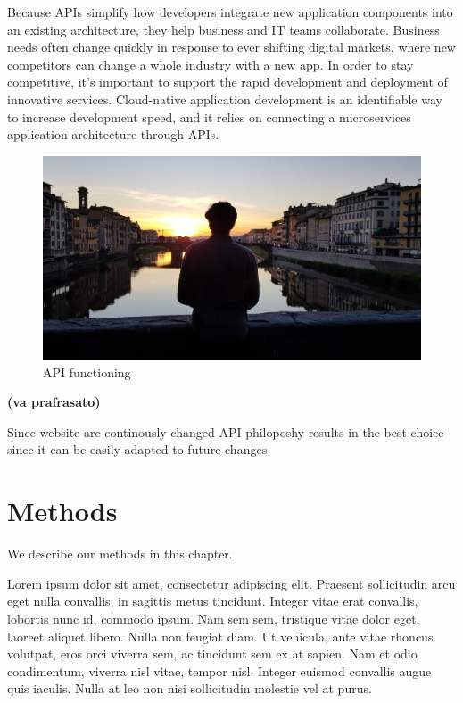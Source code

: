 \documentclass[
  12pt,
  a4paper,
  oneside]{book}
\begin{document}
Because APIs simplify how developers integrate new application components into an existing architecture, they help business and IT teams collaborate. Business needs often change quickly in response to ever shifting digital markets, where new competitors can change a whole industry with a new app. In order to stay competitive, it's important to support the rapid development and deployment of innovative services. Cloud-native application development is an identifiable way to increase development speed, and it relies on connecting a microservices application architecture through APIs.

\begin{figure}
\includegraphics[width=19.9in]{images/FIRENZE} \caption{API functioning}\label{fig:nicco}
\end{figure}

\textbf{(va prafrasato)}

Since website are continously changed API philoposhy results in the best choice since it can be easily adapted to future changes

\hypertarget{methods}{%
\chapter{Methods}\label{methods}}

We describe our methods in this chapter.

Lorem ipsum dolor sit amet, consectetur adipiscing elit. Praesent sollicitudin arcu eget nulla convallis, in sagittis metus tincidunt. Integer vitae erat convallis, lobortis nunc id, commodo ipsum. Nam sem sem, tristique vitae dolor eget, laoreet aliquet libero. Nulla non feugiat diam. Ut vehicula, ante vitae rhoncus volutpat, eros orci viverra sem, ac tincidunt sem ex at sapien. Nam et odio condimentum, viverra nisl vitae, tempor nisl. Integer euismod convallis augue quis iaculis. Nulla at leo non nisi sollicitudin molestie vel at purus.
\end{document}
